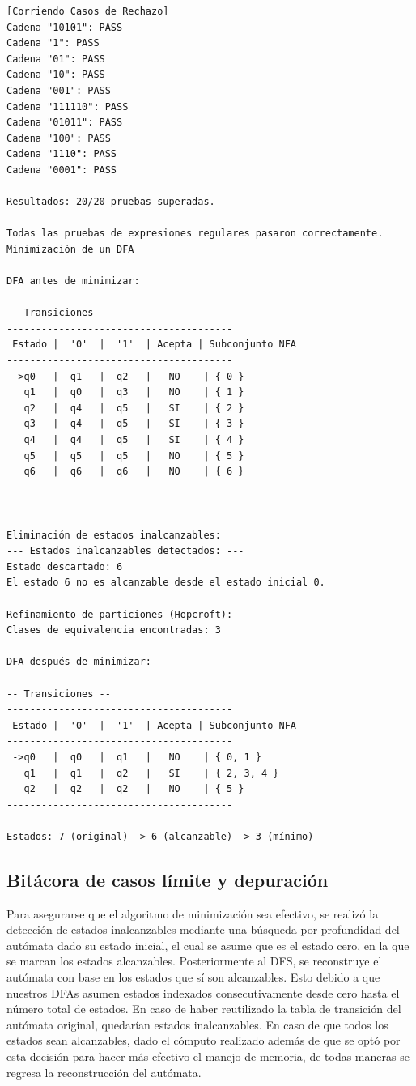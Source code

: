 \documentclass[12pt, letterpaper]{article}
\begin{document}
\begin{lstlisting}[style=bashstyle]
[Corriendo Casos de Rechazo]
Cadena "10101": PASS
Cadena "1": PASS
Cadena "01": PASS
Cadena "10": PASS
Cadena "001": PASS
Cadena "111110": PASS
Cadena "01011": PASS
Cadena "100": PASS
Cadena "1110": PASS
Cadena "0001": PASS

Resultados: 20/20 pruebas superadas.

Todas las pruebas de expresiones regulares pasaron correctamente.
Minimización de un DFA

DFA antes de minimizar:

-- Transiciones --
---------------------------------------
 Estado |  '0'  |  '1'  | Acepta | Subconjunto NFA
---------------------------------------
 ->q0   |  q1   |  q2   |   NO    | { 0 }
   q1   |  q0   |  q3   |   NO    | { 1 }
   q2   |  q4   |  q5   |   SI    | { 2 }
   q3   |  q4   |  q5   |   SI    | { 3 }
   q4   |  q4   |  q5   |   SI    | { 4 }
   q5   |  q5   |  q5   |   NO    | { 5 }
   q6   |  q6   |  q6   |   NO    | { 6 }
---------------------------------------


Eliminación de estados inalcanzables:
--- Estados inalcanzables detectados: ---
Estado descartado: 6
El estado 6 no es alcanzable desde el estado inicial 0.

Refinamiento de particiones (Hopcroft):
Clases de equivalencia encontradas: 3

DFA después de minimizar:

-- Transiciones --
---------------------------------------
 Estado |  '0'  |  '1'  | Acepta | Subconjunto NFA
---------------------------------------
 ->q0   |  q0   |  q1   |   NO    | { 0, 1 }
   q1   |  q1   |  q2   |   SI    | { 2, 3, 4 }
   q2   |  q2   |  q2   |   NO    | { 5 }
---------------------------------------

Estados: 7 (original) -> 6 (alcanzable) -> 3 (mínimo)
\end{lstlisting}

\subsection*{Bitácora de casos límite y depuración}
\noindent Para asegurarse que el algoritmo de minimización sea efectivo, se realizó la detección de estados inalcanzables mediante una búsqueda por profundidad del autómata dado su estado inicial, el cual se asume que es el estado cero, en la que se marcan los estados alcanzables. Posteriormente al DFS, se reconstruye el autómata con base en los estados que sí son alcanzables. Esto debido a que nuestros DFAs asumen estados indexados consecutivamente desde cero hasta el número total de estados. En caso de haber reutilizado la tabla de transición del autómata original, quedarían estados inalcanzables. 
En caso de que todos los estados sean alcanzables, dado el cómputo realizado además de que se optó por esta decisión para hacer más efectivo el manejo de memoria, de todas maneras se regresa la reconstrucción del autómata.
\end{document}
